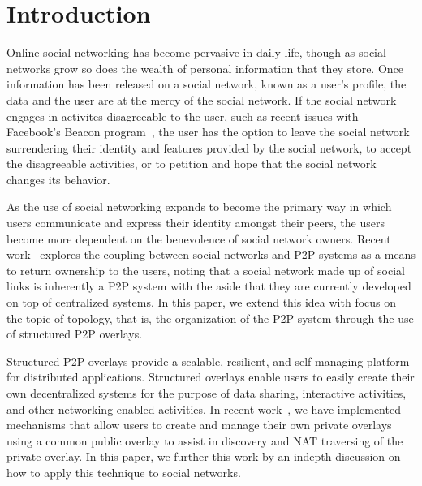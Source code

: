 \documentclass[letterpaper,twocolumn,10pt]{article}
\begin{document}
\section{Introduction}
Online social networking has become pervasive in daily life, though as social
networks grow so does the wealth of personal information that they store.  Once
information has been released on a social network, known as a user's profile,
the data and the user are at the mercy of the social network.  If the social
network engages in activites disagreeable to the user, such as recent issues
with Facebook's Beacon program~\cite{facebook_beacon}, the user has the option
to leave the social network surrendering their identity and features provided
by the social network, to accept the disagreeable activities, or to petition
and hope that the social network changes its behavior.

As the use of social networking expands to become the primary way in which users
communicate and express their identity amongst their peers, the users become
more dependent on the benevolence of social network owners.  Recent
work~\cite{p2p_socialnetwork} explores the coupling between social networks and
P2P systems as a means to return ownership to the users, noting that a social
network made up of social links is inherently a P2P system with the aside that
they are currently developed on top of centralized systems.  In this paper, we
extend this idea with focus on the topic of topology, that is, the organization
of the P2P system through the use of structured P2P overlays.

Structured P2P overlays provide a scalable, resilient, and self-managing
platform for distributed applications.  Structured overlays enable users to
easily create their own decentralized systems for the purpose of data sharing,
interactive activities, and other networking enabled activities.  In recent
work~\cite{icdcs10}, we have implemented mechanisms that allow users to create
and manage their own private overlays using a common public overlay to assist
in discovery and NAT traversing of the private overlay.  In this paper, we
further this work by an indepth discussion on how to apply this technique to
social networks.
\end{document}
